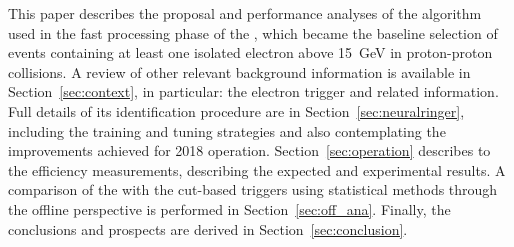 This paper describes the proposal and performance analyses of the \rnn{}
algorithm used in the fast processing phase of the \hlt{}, which became the baseline selection of events containing at least one isolated electron above \SI{15}{\GeV} in proton-proton collisions. A review
of other relevant background information is available in
Section~\ref{sec:context}, in particular: the electron
trigger and related information. Full details of its identification procedure are
in Section~\ref{sec:neuralringer}, including the training and tuning strategies and also contemplating the improvements achieved for 2018 operation. Section~\ref{sec:operation} describes to the efficiency measurements, describing the expected and experimental results. A comparison of the \rnn with
the cut-based triggers using statistical methods through the offline perspective
is performed in Section~\ref{sec:off_ana}. Finally, the conclusions and prospects 
are derived in Section~\ref{sec:conclusion}.





